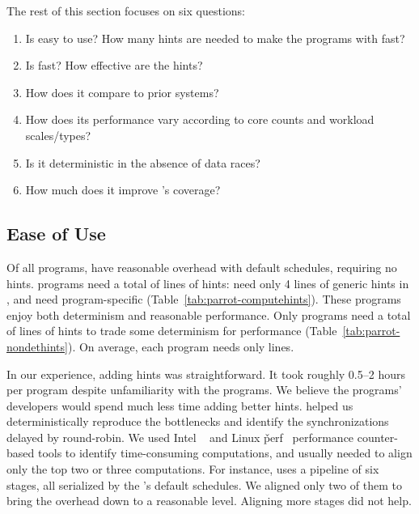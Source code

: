 The rest of this section focuses on six questions:
\begin{enumerate}

\item[\S\ref{sec:parrot-ease-of-use}:] Is \parrot easy to use?  How many hints are
  needed to make the programs with \parrot fast?

\item[\S\ref{sec:parrot-performance}:] Is \parrot fast?  How effective are the
  hints?

\item[\S\ref{sec:parrot-comparison}:] How does it compare to prior systems?

\item[\S\ref{sec:parrot-sensitivity}:] How does its performance vary according
  to core counts and workload scales/types?

\item[\S\ref{sec:parrot-determinism}:] Is it deterministic in the absence of data races?

\item[\S\ref{sec:parrot-coverage}:] How much does it improve \dbug's coverage?

\end{enumerate}

\subsection{Ease of Use} \label{sec:parrot-ease-of-use}

Of all \nprog programs, \nprognohints have reasonable overhead with
default schedules, requiring no hints.  \nproglineuphints programs need a total of 
\nlineofcomputehints lines of \compute hints: \nproggenericlineuphints
need only 4 lines of generic \compute hints in \libgomp, and
\nprogspecificlineuphints need program-specific \computes
(Table~\ref{tab:parrot-computehints}).  These programs enjoy both determinism and
reasonable performance.  Only \nprognondethints programs 
need a total of \nlineofnondethints lines of \nondet hints to
trade some determinism for performance (Table~\ref{tab:parrot-nondethints}).
On average, each program needs only \hintsperprog lines.

In our experience, adding hints was straightforward.  It took roughly 0.5--2 hours per
program despite unfamiliarity with the programs.  We believe
the programs' developers would spend much less time adding better hints.
\parrot helped us deterministically reproduce the bottlenecks and identify
the synchronizations delayed by round-robin.  We used Intel \vtune~\cite{vtune} and
Linux \v{perf}~\cite{perf} performance counter-based tools to identify time-consuming
computations, and usually needed to align only the top two or three
computations.  For instance, \ferret uses a pipeline of six stages, all
serialized by the \parrot's default schedules.  We aligned only two of them to bring
the overhead down to a reasonable level.  Aligning more stages did not help.

